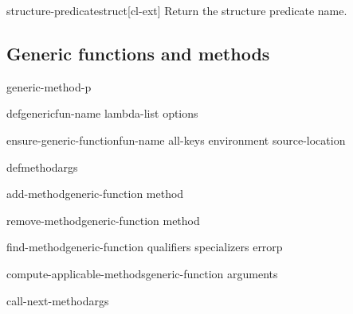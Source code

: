 \documentclass[10pt,english]{book}
\begin{document}
\begin{function}{structure-predicate}{struct}[cl-ext]
  Return the structure predicate name.
\end{function}

\subsection{Generic functions and methods}
\label{sec:generic-functions}

\begin{function}{generic-method-p}{}
  
\end{function}

\begin{macro}{defgeneric}{fun-name lambda-list \body options}
  
\end{macro}

\begin{function}{ensure-generic-function}{fun-name \rest all-keys \key environment source-location \akeys}
  
\end{function}

\begin{macro}{defmethod}{\rest args}
  
\end{macro}

\begin{generic}{add-method}{generic-function method}
  
\end{generic}

\begin{generic}{remove-method}{generic-function method}
  
\end{generic}

\begin{generic}{find-method}{generic-function qualifiers specializers \op errorp}
  
\end{generic}

\begin{generic}{compute-applicable-methods}{generic-function arguments}
  
\end{generic}

\begin{function}{call-next-method}{\rest args}
  
\end{function}
\end{document}
